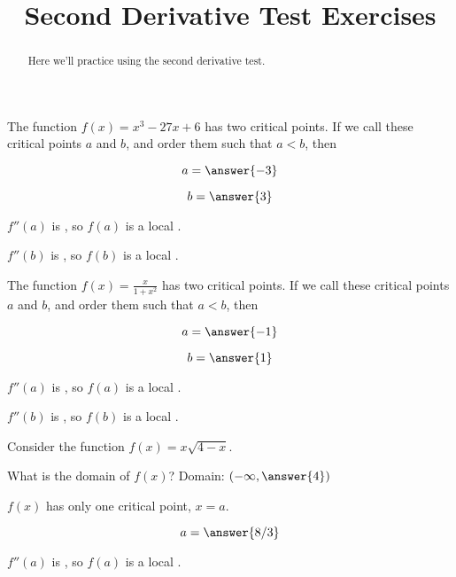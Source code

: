 \documentclass[handout]{ximera}
\title{Second Derivative Test Exercises}
\begin{document}
\begin{abstract}
  Here we'll practice using the second derivative test.
\end{abstract}
\maketitle

\begin{exercise}
The function $f(x) = x^3-27x+6$ has two critical points.  If we call
these critical points $a$ and $b$, and order them such that $a < b$,
then

$$
a = \answer{-3}
$$

$$
b=\answer{3}
$$

$f''(a)$ is , so $f(a)$ is a local .

$f''(b)$ is , so $f(b)$ is a local .
\end{exercise}

\begin{exercise}
The function $f(x) = \displaystyle\frac{x}{1+x^2}$ has two critical points.  If we call
these critical points $a$ and $b$, and order them such that $a < b$,
then

$$
a = \answer{-1}
$$

$$
b=\answer{1}
$$

$f''(a)$ is , so $f(a)$ is a local .

$f''(b)$ is , so $f(b)$ is a local .
\end{exercise}

\begin{exercise}
Consider the function $f(x) = x\sqrt{4-x}$.

What is the domain of $f(x)$?  Domain: $(-\infty,  \answer{4})$

$f(x)$ has only one critical point, $x=a$.

$$
a = \answer{8/3}
$$


$f''(a)$ is , so $f(a)$ is a local .
\end{exercise}
\end{document}
